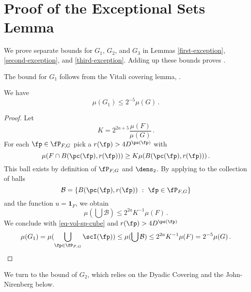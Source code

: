 \section{Proof of the Exceptional Sets Lemma}
\label{subsetexcset}


We prove separate bounds for $G_1$, $G_2$, and $G_3$
in Lemmas \ref{first-exception},
\ref{second-exception}, and \ref{third-exception}. Adding up these bounds proves .

The bound for $G_1$ follows from the Vitali covering lemma, .

\begin{lemma}
    \label{first-exception}
    \leanok
    We have
    \begin{equation}
        \mu(G_1)\le 2^{-5}\mu(G)\, .
    \end{equation}
\end{lemma}
\begin{proof}
    \leanok
    Let
    $$
        K = 2^{2a+5}\frac{\mu(F)}{\mu(G)}\,.
    $$
    For each $\fp\in \fP_{F,G}$ pick a
    $r(\fp)>4D^{\ps(\fp)}$ with
    $$
    {\mu(F\cap B(\pc(\fp),r(\fp)))}\ge K{\mu(B(\pc(\fp),r(\fp)))}\, .
    $$
    This ball exists by definition of $\fP_{F,G}$
    and $\dens_2$. By applying  to the collection of balls
    $$
        \mathcal{B} = \{B(\pc(\fp),r(\fp)) \ : \ \fp \in \fP_{F,G}\}
    $$
    and the function $u = \mathbf{1}_F$, we obtain
    $$
        \mu(\bigcup \mathcal{B}) \le 2^{2a} K^{-1} \mu(F)\,.
    $$
    We conclude with \eqref{eq-vol-sp-cube} and $r(\fp)>4D^{\ps(\fp)}$
    $$
        \mu(G_1)= \mu(\bigcup_{\fp\in \fP_{F,G}} \scI(\fp))
        \le \mu(\bigcup \mathcal{B})\le 2^{2a} K^{-1} \mu (F) = 2^{-5}\mu(G)\,.
    $$
\end{proof}


We turn to the bound of $G_2$, which relies on the Dyadic Covering  and the
John-Nirenberg  below.

